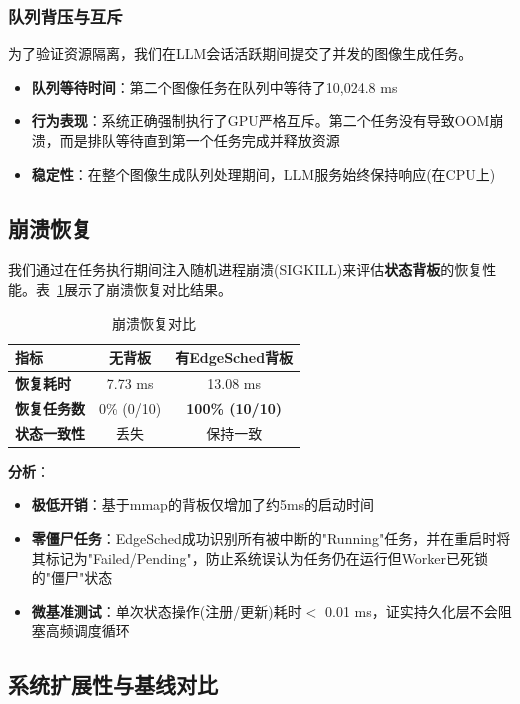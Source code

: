 \subsubsection{队列背压与互斥}

为了验证资源隔离，我们在LLM会话活跃期间提交了并发的图像生成任务。

\begin{itemize}
\item \textbf{队列等待时间}：第二个图像任务在队列中等待了10,024.8 ms
\item \textbf{行为表现}：系统正确强制执行了GPU严格互斥。第二个任务没有导致OOM崩溃，而是排队等待直到第一个任务完成并释放资源
\item \textbf{稳定性}：在整个图像生成队列处理期间，LLM服务始终保持响应(在CPU上)
\end{itemize}


\subsection{崩溃恢复}

我们通过在任务执行期间注入随机进程崩溃(SIGKILL)来评估\textbf{状态背板}的恢复性能。表~\ref{tab:recovery}展示了崩溃恢复对比结果。

\begin{table}[htbp]
\caption{崩溃恢复对比}
\label{tab:recovery}
\centering
\begin{tabular}{@{}lcc@{}}
\toprule
指标 & 无背板 & 有EdgeSched背板 \\
\midrule
\textbf{恢复耗时} & 7.73 ms & 13.08 ms \\
\textbf{恢复任务数} & 0\% (0/10) & \textbf{100\% (10/10)} \\
\textbf{状态一致性} & 丢失 & 保持一致 \\
\bottomrule
\end{tabular}
\end{table}

\textbf{分析}：
\begin{itemize}
\item \textbf{极低开销}：基于mmap的背板仅增加了约5ms的启动时间
\item \textbf{零僵尸任务}：EdgeSched成功识别所有被中断的"Running"任务，并在重启时将其标记为"Failed/Pending"，防止系统误认为任务仍在运行但Worker已死锁的"僵尸"状态
\item \textbf{微基准测试}：单次状态操作(注册/更新)耗时$<$ 0.01 ms，证实持久化层不会阻塞高频调度循环
\end{itemize}

\subsection{系统扩展性与基线对比}

